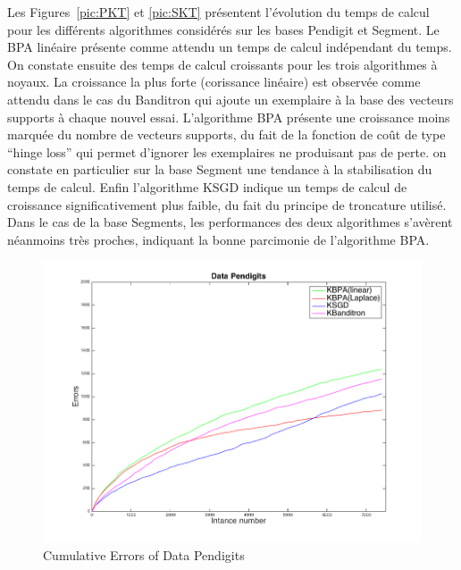 \documentclass[twocolumn]{article}
\begin{document}
Les Figures~\ref{pic:PKT} et \ref{pic:SKT} présentent l'évolution du temps de calcul pour les différents algorithmes considérés sur les bases Pendigit  et Segment.  Le BPA linéaire présente comme attendu un temps de calcul indépendant du temps. On constate ensuite des temps de calcul croissants pour les trois algorithmes à noyaux. La croissance la plus forte (corissance linéaire) est observée comme attendu dans le cas du Banditron qui ajoute un exemplaire à la base des vecteurs supports à chaque nouvel essai. L'algorithme BPA présente une croissance moins marquée du nombre de vecteurs supports, du fait de la fonction de coût de type ``hinge loss'' qui permet d'ignorer les exemplaires ne produisant pas de perte.  on constate en particulier sur la base Segment une tendance à la stabilisation du temps de calcul. Enfin l'algorithme KSGD indique un temps de calcul de croissance significativement plus faible, du fait du principe de troncature utilisé. Dans le cas de la base Segments, les performances des deux algorithmes s'avèrent néanmoins très proches, indiquant la bonne parcimonie de l'algorithme BPA.

\begin{figure}[t!]
	\centerline{
		\includegraphics[width=\linewidth]{figs/Pendigits_kernel_CM.png}}
	\caption{Cumulative Errors of Data Pendigits}
	\label{pic:PKCM}
\end{figure}

\end{document}
